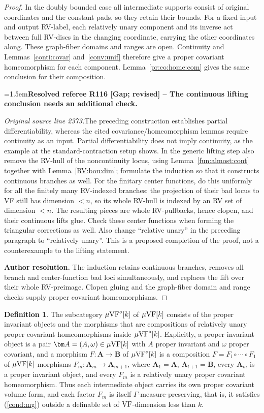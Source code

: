 \documentclass[12pt]{amsart}
\newcommand{\ResolvedRefereeRemark}[5]{%
  \par\medskip\begingroup\normalfont\small\color{gray}%
  \emergencystretch=1.5em\noindent\textbf{Resolved referee R#1 [#2] -- #3.}\par\nobreak\noindent #4\par
  \medskip\color{ResolutionGreen}\noindent\textbf{Author resolution.} #5\par
  \endgroup\medskip
}
\theoremstyle{plain}
\theoremstyle{definition}
\newtheorem{defn}[thm]{Definition}
\theoremstyle{remark}
\numberwithin{equation}{section}
\theoremstyle{plain}
\newcommand{\VF}{\textup{VF}}
\newcommand{\0}{\emptyset}
\newcommand{\fun}{\longrightarrow}
\newcommand{\mVF}{{\mu}{\VF}}
\begin{document}
\begin{proof}
In the doubly bounded case all intermediate supports consist of original coordinates and the constant pads, so they retain their bounds. For a fixed input and output RV-label, each relatively unary component and its inverse act between full RV-discs in the changing coordinate, carrying the other coordinates along. These graph-fiber domains and ranges are open. Continuity and Lemmas~\ref{conti:covar} and~\ref{conv:unif} therefore give a proper covariant homeomorphism for each component. Lemma~\ref{pr:co:home:com} gives the same conclusion for their composition.

\ResolvedRefereeRemark{116}{Gap; revised}{The continuous lifting conclusion needs an additional check}{%
\textit{Original source line 2373.}\quad The preceding construction establishes partial differentiability, whereas the cited covariance/homeomorphism lemmas require continuity as an input. Partial differentiability does not imply continuity, as the example at the standard-contraction setup shows. In the generic lifting step also remove the RV-hull of the noncontinuity locus, using Lemma~\ref{fun:almost:cont} together with Lemma~\ref{RV:bou:dim}; formulate the induction so that it constructs continuous branches as well. For the finitary center functions, do this uniformly for all the finitely many RV-indexed branches: the projection of their bad locus to VF still has dimension $<n$, so its whole RV-hull is indexed by an RV set of dimension $<n$. The resulting pieces are whole RV-pullbacks, hence clopen, and their continuous lifts glue. Check these center functions when forming the triangular corrections as well. Also change ``relative unary'' in the preceding paragraph to ``relatively unary''. This is a proposed completion of the proof, not a counterexample to the lifting statement.
}{The induction retains continuous branches, removes all branch and center-function bad loci simultaneously, and replaces the lift over their whole RV-preimage. Clopen gluing and the graph-fiber domain and range checks supply proper covariant homeomorphisms.}
\end{proof}


\begin{defn}\label{defn:diamond}
The subcategory $\mVF^{\diamond}[k]$ of $\mVF[k]$ consists of the proper invariant objects and the morphisms that are compositions of relatively unary proper covariant homeomorphisms inside $\mVF^{\diamond}[k]$. Explicitly, a proper invariant object is a pair $\bm A = (A, \omega) \in \mVF[k]$ with $A$ proper invariant and $\omega$ proper covariant, and a morphism $F : \bm A \fun \bm B$ of $\mVF^{\diamond}[k]$ is a composition $F = F_l \circ \cdots \circ F_1$ of $\mVF[k]$-morphisms $F_m : \bm A_m \fun \bm A_{m+1}$, where $\bm A_1 = \bm A$, $\bm A_{l+1} = \bm B$, every $\bm A_m$ is a proper invariant object, and every $F_m$ is a relatively unary proper covariant homeomorphism. Thus each intermediate object carries its own proper covariant volume form, and each factor $F_m$ is itself $\Gamma$-measure-preserving, that is, it satisfies (\ref{cond:mg}) outside a definable set of $\VF$-dimension less than $k$.
\end{defn}
\end{document}
